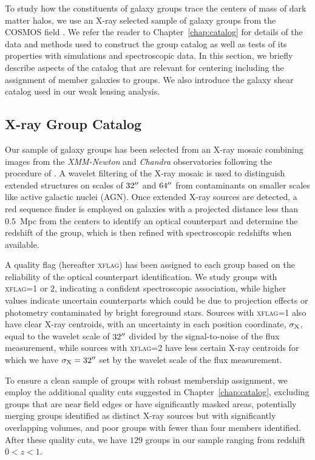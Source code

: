 To study how the constituents of galaxy groups trace the centers of
mass of 
dark matter halos, we use an X-ray selected sample of galaxy groups
from the COSMOS field \citep{Scoville2007a}. We refer the reader to
Chapter~\ref{chap:catalog} for details of the data and methods used to construct the
group catalog as well as tests of its properties with simulations and
spectroscopic data. In this section, we briefly describe aspects of the
catalog that are relevant for centering including the assignment of
member galaxies to groups. We also introduce the galaxy shear catalog
used in our weak lensing analysis.

\subsection{X-ray Group Catalog}
\label{cen_s:xray}

Our sample of galaxy groups has been selected from an X-ray mosaic
combining images from the {\sl XMM-Newton} \citep{Hasinger2007} and
{\sl Chandra} \citep{Elvis2009} observatories following the procedure
of \citet{Finoguenov2009, Finoguenov2010}. A wavelet filtering of the
X-ray mosaic is used to distinguish extended structures on scales of
$32\mbox{$^{\prime\prime}$}$ and $64\mbox{$^{\prime\prime}$}$ from contaminants on smaller scales like
active galactic nuclei (AGN). Once extended X-ray sources are
detected, a red sequence finder is employed on galaxies with a
projected distance less than $0.5$~Mpc from the centers to identify an
optical counterpart and determine the redshift of the group, which is
then refined with spectroscopic redshifts when available.

A quality flag (hereafter \textsc{xflag}) has been assigned to each group
based on the reliability of the optical counterpart identification. We
study groups with \textsc{xflag}=1 or 2, indicating a confident spectroscopic
association, while higher values indicate uncertain counterparts which
could be due to projection effects or photometry contaminated by
bright foreground stars. Sources with \textsc{xflag}=1 also have clear
X-ray centroids, with an uncertainty in each position coordinate,
$\sigma_{\rm X}$, equal to the wavelet scale of $32\mbox{$^{\prime\prime}$}$ divided by
the signal-to-noise of the flux measurement, while sources with
\textsc{xflag}=2 have less certain X-ray centroids for which we have
$\sigma_{\rm X} = 32\mbox{$^{\prime\prime}$}$ set by the wavelet scale of the flux
measurement. 

To ensure a clean sample of groups with robust membership assignment,
we employ the additional quality cuts suggested in Chapter~\ref{chap:catalog}, excluding
groups that are near field edges or have significantly masked areas,
potentially merging groups identified as distinct X-ray sources but
with significantly overlapping volumes, and poor groups with fewer
than four members identified. After these quality cuts, we have $129$
groups in our sample ranging from redshift $0<z<1$.


